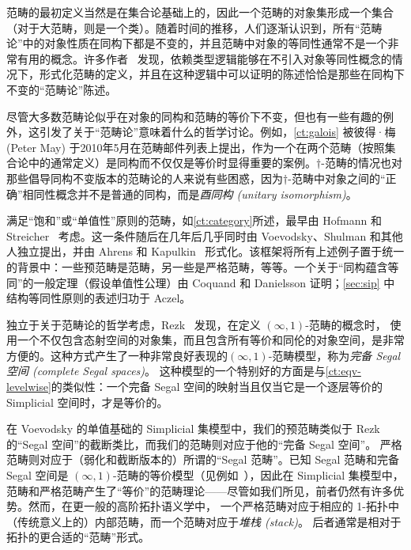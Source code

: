 范畴的最初定义当然是在集合论基础上的，因此一个范畴的对象集形成一个集合（对于大范畴，则是一个类）。随着时间的推移，人们逐渐认识到，所有“范畴论”中的对象性质在同构下都是不变的，并且范畴中对象的等同性通常不是一个非常有用的概念。许多作者~\cite{blanc:eqv-log,freyd:invar-eqv,makkai:folds,makkai:comparing} 发现，依赖类型逻辑能够在不引入对象等同性概念的情况下，形式化范畴的定义，并且在这种逻辑中可以证明的陈述恰恰是那些在同构下不变的“范畴论”陈述。
%

尽管大多数范畴论似乎在对象的同构和范畴的等价下不变，但也有一些有趣的例外，这引发了关于“范畴论”意味着什么的哲学讨论。例如，\cref{ct:galois} 被彼得·梅 (Peter May) 于2010年5月在范畴邮件列表上提出，作为一个在两个范畴（按照集合论中的通常定义）是同构而不仅仅是等价时显得重要的案例。$\dagger$-范畴的情况也对那些倡导同构不变版本的范畴论的人来说有些困惑，因为$\dagger$-范畴中对象之间的“正确”相同性概念并不是普通的同构，而是\emph{酉同构 (unitary isomorphism)}。
%

满足“饱和”或“单值性”原则的范畴，如\cref{ct:category}所述，最早由 Hofmann 和 Streicher~\cite{hs:gpd-typethy} 考虑。这一条件随后在几年后几乎同时由 Voevodsky、Shulman 和其他人独立提出，并由 Ahrens 和 Kapulkin~\cite{aks:rezk} 形式化。该框架将所有上述例子置于统一的背景中：一些预范畴是范畴，另一些是严格范畴，等等。一个关于“同构蕴含等同”的一般定理（假设单值性公理）由 Coquand 和 Danielsson 证明；\cref{sec:sip} 中结构等同性原则的表述归功于 Aczel。

独立于关于范畴论的哲学考虑，Rezk~\cite{rezk01css} 发现，在定义 $(\infty,1)$-范畴的概念时，
%
使用一个不仅包含态射空间的对象集，而且包含所有等价和同伦的对象空间，是非常方便的。这种方式产生了一种非常良好表现的$(\infty,1)$-范畴模型，称为\emph{完备 Segal 空间 (complete Segal spaces)}。
%
%
这种模型的一个特别好的方面是与\cref{ct:eqv-levelwise}的类似性：一个完备 Segal 空间的映射当且仅当它是一个逐层等价的 Simplicial 空间时，才是等价的。

在 Voevodsky 的单值基础的 Simplicial 集模型中，我们的预范畴类似于 Rezk 的“Segal 空间”的截断类比，而我们的范畴则对应于他的“完备 Segal 空间”。
%
严格范畴则对应于（弱化和截断版本的）所谓的“Segal 范畴”。已知 Segal 范畴和完备 Segal 空间是 $(\infty,1)$-范畴的等价模型（见例如~\cite{bergner:infty-one}），因此在 Simplicial 集模型中，范畴和严格范畴产生了“等价”的范畴理论——尽管如我们所见，前者仍然有许多优势。然而，在更一般的高阶拓扑语义学中，
%
一个严格范畴对应于相应的 1-拓扑中（传统意义上的）内部范畴，而一个范畴对应于\emph{堆栈 (stack)}。
%
后者通常是相对于拓扑的更合适的“范畴”形式。

